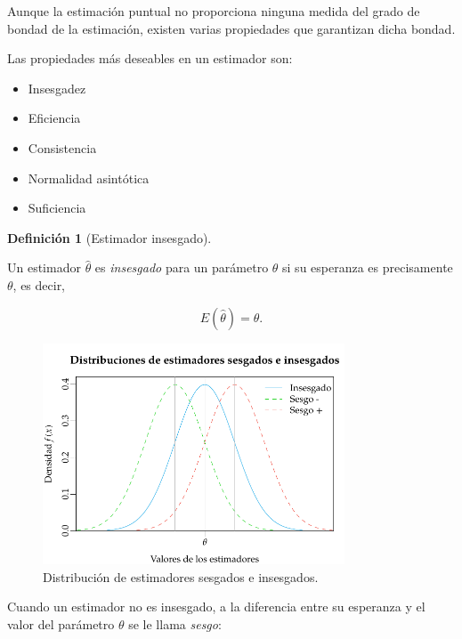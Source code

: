\documentclass[
  a4paper,
]{scrreport}
\providecommand{\tightlist}{%
  \setlength{\itemsep}{0pt}\setlength{\parskip}{0pt}}\usepackage{longtable,booktabs,array}
\theoremstyle{plain}
\theoremstyle{definition}
\theoremstyle{definition}
\newtheorem{definition}{Definición}[chapter]
\theoremstyle{remark}
\begin{document}
Aunque la estimación puntual no proporciona ninguna medida del grado de
bondad de la estimación, existen varias propiedades que garantizan dicha
bondad.

Las propiedades más deseables en un estimador son:

\begin{itemize}
\tightlist
\item
  Insesgadez
\item
  Eficiencia
\item
  Consistencia
\item
  Normalidad asintótica
\item
  Suficiencia
\end{itemize}

\begin{definition}[Estimador
insesgado]\protect\hypertarget{def-estimador-insesgado}{}\label{def-estimador-insesgado}

Un estimador \(\hat \theta\) es \emph{insesgado} para un parámetro
\(\theta\) si su esperanza es precisamente \(\theta\), es decir,

\[
E(\hat \theta)=\theta.
\]

\end{definition}

\begin{figure}[H]

{\centering \includegraphics[width=0.8\textwidth,height=\textheight]{img/estimacion/estimadores-sesgados-insesgados.pdf}

}

\caption{Distribución de estimadores sesgados e insesgados.}

\end{figure}%

Cuando un estimador no es insesgado, a la diferencia entre su esperanza
y el valor del parámetro \(\theta\) se le llama \emph{sesgo}:
\end{document}
